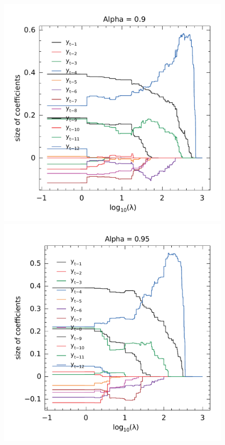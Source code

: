\begin{figure}
\begin{minipage}[t]{0.4\linewidth}
\begin{minipage}[b]{\linewidth}
     \end{minipage}
  \end{minipage}
  \begin{minipage}[t]{0.4\linewidth}
    \centering
    \begin{minipage}[b]{\linewidth}
      \centering     \includegraphics[width=\textwidth]{Figuras/selecao-lasso/par-sellasso-09.pdf}
    \end{minipage}
     \begin{minipage}[b]{\linewidth}
      \centering     \includegraphics[width=\textwidth]{Figuras/selecao-lasso/par-sellasso-095.pdf}

\end{minipage}
\end{minipage}
\end{figure}
